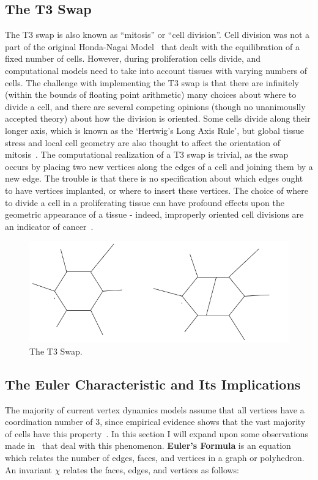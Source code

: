\subsection{The T3 Swap}
The T3 swap is also known as ``mitosis'' or ``cell division''. Cell division was not a part of the original Honda-Nagai Model~\cite{HondaNagai} that dealt with the equilibration of a fixed number of cells. However, during proliferation cells divide, and computational models need to take into account tissues with varying numbers of cells. The challenge with implementing the T3 swap is that there are infinitely (within the bounds of floating point arithmetic) many choices about where to divide a cell, and there are several competing opinions (though no unanimouslly accepted theory) about how the division is oriented. Some cells divide along their longer axis, which is known as the `Hertwig's Long Axis Rule', but global tissue stress and local cell geometry are also thought to affect the orientation of mitosis~\cite{Order, Orientation}. The computational realization of a T3 swap is trivial, as the swap occurs by placing two new vertices along the edges of a cell and joining them by a new edge. The trouble is that there is no specification about which edges ought to have vertices implanted, or where to insert these vertices. The choice of where to divide a cell in a proliferating tissue can have profound effects upon the geometric appearance of a tissue - indeed, improperly oriented cell divisions are an indicator of cancer~\cite{EpithelialTopology, misaligned}. 
\begin{figure}
\centering
\includegraphics[width=\textwidth]{../diagrams/t3.png}
\caption[The T3 Swap.]{The T3 Swap.}
\label{fig:t3}
\end{figure}

\subsection{The Euler Characteristic and Its Implications}
The majority of current vertex dynamics models assume that all vertices have a coordination number of 3, since empirical evidence shows that the vast majority of cells have this property~\cite{EpithelialTopology,Overview}. In this section I will expand upon some observations made in~\cite{Soap} that deal with this phenomenon. \textbf{Euler's Formula} is an equation which relates the number of edges, faces, and vertices in a graph or polyhedron. An invariant $\chi$ relates the faces, edges, and vertices as follows:

